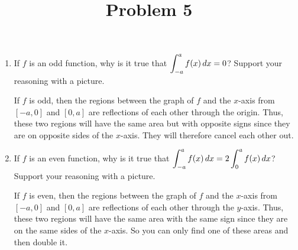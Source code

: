 \documentclass{ximera}
\title[Problem 5]{Problem 5}
\begin{document}
\begin{abstract} \end{abstract}
\maketitle


\begin{problem}

  \begin{enumerate}
    \item
    If $f$ is an odd function, why is it true that $\displaystyle \int_{-a}^a f(x)
    \,d x = 0$?  
    Support your reasoning with a picture.
    \begin{explanation}
      If $f$ is odd, then the regions between the graph of $f$ and the $x$-axis from $[-a,0]$ and $[0,a]$ are reflections of each other through the origin.
      Thus, these two regions will have the same area but with opposite signs since they are on opposite sides of the $x$-axis.
      They will therefore cancel each other out.
		
    \end{explanation}

\item
      If $f$ is an even function, why is it true that $\displaystyle \int_{-a}^a f(x) \,d x = 2 \displaystyle \int_0^a f(x) \,d x$?
      Support your reasoning with a picture.
      \begin{explanation}
        If $f$ is even, then the regions between the graph of $f$ and the $x$-axis from $[-a,0]$ and $[0,a]$ are reflections of each other through the $y$-axis.
        Thus, these two regions will have the same area with the same sign since they are on the same sides of the $x$-axis.
        So you can only find one of these areas and then double it.
    \end{explanation}
\end{enumerate}
\end{problem}
\end{document}
